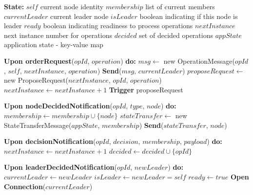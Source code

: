 \documentclass[10pt,a4paper,twocolumn]{article}
\begin{document}
\begin{algorithm}
\caption{State Machine Protocol}
\begin{algorithmic}
\State \textbf{State:}
\State \hspace{1em} $self$ {current node identity}
\State \hspace{1em} $membership$ {list of current members}
\State \hspace{1em} $currentLeader$ {current leader node}
\State \hspace{1em} $isLeader$ {boolean indicating if this node is leader}
\State \hspace{1em} $ready$ {boolean indicating readiness to process operations}
\State \hspace{1em} $nextInstance$ {next instance number for operations}
\State \hspace{1em} $decided$ {set of decided operations}
\State \hspace{1em} $appState$ {application state - key-value map}
\State

\State \textbf{Upon orderRequest}($opId$, $operation$) \textbf{do:}
\State \Return
\EndIf
{}
\State \Return
\EndIf
{}
\State $msg \leftarrow$ new OperationMessage($opId$, $self$, $nextInstance$, $operation$)
\State \textbf{Send}($msg$, $currentLeader$)
\State \Return
\EndIf
\State $proposeRequest \leftarrow$ new ProposeRequest($nextInstance$, $opId$, $operation$)
\State $nextInstance \leftarrow nextInstance + 1$
\State \textbf{Trigger} proposeRequest
\State

\State \textbf{Upon nodeDecidedNotification}($opId$, $type$, $node$) \textbf{do:}
\State \Return
\EndIf
\State $membership \leftarrow membership \cup \{node\}$
\State $stateTransfer \leftarrow$ new StateTransferMessage($appState$, $membership$)
\State \textbf{Send}($stateTransfer$, $node$)
\EndIf
\State

\State \textbf{Upon decisionNotification}($opId$, $decision$, $membership$, $payload$) \textbf{do:}
\State \Return
\EndIf
{}
\State $nextInstance \leftarrow nextInstance + 1$
\State $decided \leftarrow decided \cup \{opId\}$
\State {}
\EndIf
\EndIf
\State

\State \textbf{Upon leaderDecidedNotification}($opId$, $newLeader$) \textbf{do:}
\State $currentLeader \leftarrow newLeader$
\State $isLeader \leftarrow newLeader = self$
\State $ready \leftarrow true$
\Else
\State \textbf{Open Connection}($currentLeader$)
\EndIf

\end{algorithmic}
\end{algorithm}




\end{document}
